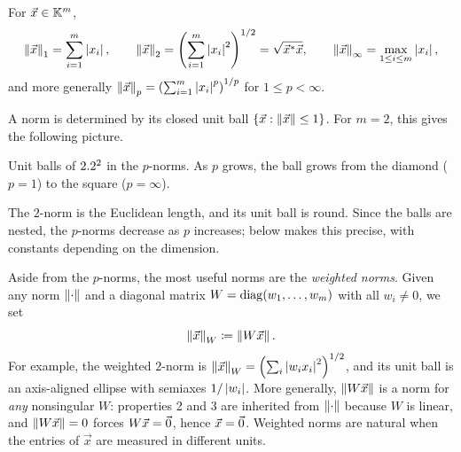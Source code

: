 \begin{definition}[$p$-Norms]
  For $\vec{x} \in \mathbb{K}^m$,
  \begin{equation}
    \left\lVert \vec{x} \right\rVert_1 = \sum_{i=1}^{m}\left\lvert x_i \right\rvert, \qquad \left\lVert \vec{x} \right\rVert_2 = \left(\sum_{i=1}^{m}\left\lvert x_i \right\rvert^2\right)^{1/2} = \sqrt{\vec{x}^\ast\vec{x}}, \qquad \left\lVert \vec{x} \right\rVert_\infty = \max_{1 \le i \le m}\left\lvert x_i \right\rvert,
  \end{equation}
  and more generally $\left\lVert \vec{x} \right\rVert_p = \left(\sum_{i=1}^{m}\left\lvert x_i \right\rvert^p\right)^{1/p}$ for $1 \le p < \infty$.
\end{definition}

A norm is determined by its closed unit ball $\{\vec{x} : \left\lVert \vec{x} \right\rVert \le 1\}$. For $m = 2$, this gives the following picture.

\begin{center}

\small Unit balls of $2.2^2$ in the $p$-norms. As $p$ grows, the ball grows from the diamond ($p = 1$) to the square ($p = \infty$).
\end{center}

The $2$-norm is the Euclidean length, and its unit ball is round. Since the balls are nested, the $p$-norms decrease as $p$ increases;  below makes this precise, with constants depending on the dimension.

Aside from the $p$-norms, the most useful norms are the \emph{weighted norms}. Given any norm $\left\lVert \cdot \right\rVert$ and a diagonal matrix $W = \operatorname{diag}(w_1, \dots, w_m)$ with all $w_i \ne 0$, we set
\begin{equation}
  \left\lVert \vec{x} \right\rVert_W \coloneqq \left\lVert W\vec{x} \right\rVert.
\end{equation}
For example, the weighted $2$-norm is $\left\lVert \vec{x} \right\rVert_W = \left(\sum_i\left\lvert w_ix_i \right\rvert^2\right)^{1/2}$, and its unit ball is an axis-aligned ellipse with semiaxes $1/\left\lvert w_i \right\rvert$. More generally, $\left\lVert W\vec{x} \right\rVert$ is a norm for \emph{any} nonsingular $W$: properties 2 and 3 are inherited from $\left\lVert \cdot \right\rVert$ because $W$ is linear, and $\left\lVert W\vec{x} \right\rVert = 0$ forces $W\vec{x} = \vec{0}$, hence $\vec{x} = \vec{0}$. Weighted norms are natural when the entries of $\vec{x}$ are measured in different units.


